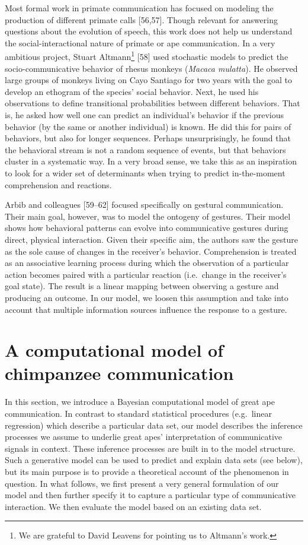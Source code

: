 \documentclass[
  english,
  man,floatsintext]{apa6}
\begin{document}
Most formal work in primate communication has focused on modeling the production of different primate calls {[}56,57{]}. Though relevant for answering questions about the evolution of speech, this work does not help us understand the social-interactional nature of primate or ape communication. In a very ambitious project, Stuart Altmann\footnote{We are grateful to David Leavens for pointing us to Altmann's work.} {[}58{]} used stochastic models to predict the socio-communicative behavior of rhesus monkeys (\emph{Macaca mulatta}). He observed large groups of monkeys living on Cayo Santiago for two years with the goal to develop an ethogram of the species' social behavior. Next, he used his observations to define transitional probabilities between different behaviors. That is, he asked how well one can predict an individual's behavior if the previous behavior (by the same or another individual) is known. He did this for pairs of behaviors, but also for longer sequences. Perhaps unsurprisingly, he found that the behavioral stream is not a random sequence of events, but that behaviors cluster in a systematic way. In a very broad sense, we take this as an inspiration to look for a wider set of determinants when trying to predict in-the-moment comprehension and reactions.

Arbib and colleagues {[}59--62{]} focused specifically on gestural communication. Their main goal, however, was to model the ontogeny of gestures. Their model shows how behavioral patterns can evolve into communicative gestures during direct, physical interaction. Given their specific aim, the authors saw the gesture as the sole cause of changes in the receiver's behavior. Comprehension is treated as an associative learning process during which the observation of a particular action becomes paired with a particular reaction (i.e.~change in the receiver's goal state). The result is a linear mapping between observing a gesture and producing an outcome. In our model, we loosen this assumption and take into account that multiple information sources influence the response to a gesture.

\hypertarget{a-computational-model-of-chimpanzee-communication}{%
\section{A computational model of chimpanzee communication}\label{a-computational-model-of-chimpanzee-communication}}

In this section, we introduce a Bayesian computational model of great ape communication. In contrast to standard statistical procedures (e.g.~linear regression) which describe a particular data set, our model describes the inference processes we assume to underlie great apes' interpretation of communicative signals in context. These inference processes are built in to the model structure. Such a generative model can be used to predict and explain data sets (see below), but its main purpose is to provide a theoretical account of the phenomenon in question. In what follows, we first present a very general formulation of our model and then further specify it to capture a particular type of communicative interaction. We then evaluate the model based on an existing data set.
\end{document}
